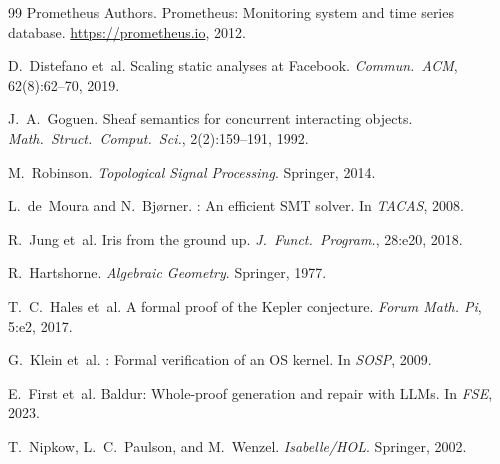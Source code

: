 \documentclass[11pt]{article}
\begin{document}
\begin{thebibliography}{99}
Prometheus Authors.
\newblock Prometheus: Monitoring system and time series database.
\newblock \url{https://prometheus.io}, 2012.

D.~Distefano et~al.
\newblock Scaling static analyses at {F}acebook.
\newblock \emph{Commun.~ACM}, 62(8):62--70, 2019.

J.~A.~Goguen.
\newblock Sheaf semantics for concurrent interacting objects.
\newblock \emph{Math.~Struct.~Comput.~Sci.}, 2(2):159--191, 1992.

M.~Robinson.
\newblock \emph{Topological Signal Processing}.
\newblock Springer, 2014.

L.~de~Moura and N.~Bj{\o}rner.
: An efficient {SMT} solver.
\newblock In \emph{TACAS}, 2008.

R.~Jung et~al.
\newblock Iris from the ground up.
\newblock \emph{J.~Funct.~Program.}, 28:e20, 2018.

R.~Hartshorne.
\newblock \emph{Algebraic Geometry}.
\newblock Springer, 1977.

T.~C.~Hales et~al.
\newblock A formal proof of the {K}epler conjecture.
\newblock \emph{Forum Math. Pi}, 5:e2, 2017.

G.~Klein et~al.
: Formal verification of an {OS} kernel.
\newblock In \emph{SOSP}, 2009.

E.~First et~al.
\newblock Baldur: Whole-proof generation and repair with LLMs.
\newblock In \emph{FSE}, 2023.

T.~Nipkow, L.~C.~Paulson, and M.~Wenzel.
\newblock \emph{Isabelle/HOL}.
\newblock Springer, 2002.

\end{thebibliography}
\end{document}
